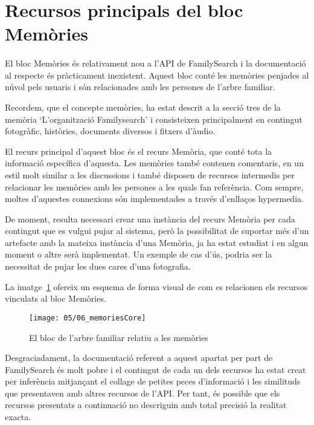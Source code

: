 \section{Recursos principals del bloc Memòries}

    \paragraph{}
    El bloc Memòries és relativament nou a l'API de FamilySearch i la documentació al respecte és pràcticament inexistent. Aquest bloc conté les memòries penjades al núvol pels usuaris i són relacionades amb les persones de l'arbre familiar.

    Recordem, que el concepte memòries, ha estat descrit a la secció tres de la memòria `L'organització Familysearch' i consisteixen principalment en contingut fotogràfic, històries, documents diversos i fitxers d'àudio.

    El recurs principal d'aquest bloc és el recurs Memòria, que conté tota la informació específica d'aquesta. Les memòries també contenen comentaris, en un estil molt similar a les discussions i també disposen de recursos intermedis per relacionar les memòries amb les persones a les quals fan referència. Com sempre, moltes d'aquestes connexions són implementades a través d'enllaços hypermedia.

    De moment, resulta necessari crear una instància del recurs Memòria per cada contingut que es vulgui pujar al sistema, però la possibilitat de suportar més d'un artefacte amb la mateixa instància d'una Memòria, ja ha estat estudiat i en algun moment o altre serà implementat. Un exemple de cas d'ús, podria ser la necessitat de pujar les dues cares d'una fotografia.

    La imatge~\ref{img:memoriesBloc} ofereix un esquema de forma visual de com es relacionen els recursos vinculats al bloc Memòries.

    \begin{figure}[h]
        \texttt{[image: 05/06\_memoriesCore]}
        \centering
        \caption{El bloc de l'arbre familiar relatiu a les memòries}\label{img:memoriesBloc}
    \end{figure}

    Desgraciadament, la documentació referent a aquest apartat per part de Family\-Search és molt pobre i el contingut de cada un dels recursos ha estat creat per inferència mitjançant el collage de petites peces d'informació i les similituds que presentaven amb altres recursos de l'API. Per tant, és possible que els recursos presentats a continuació no descriguin amb total precisió la realitat exacta.

